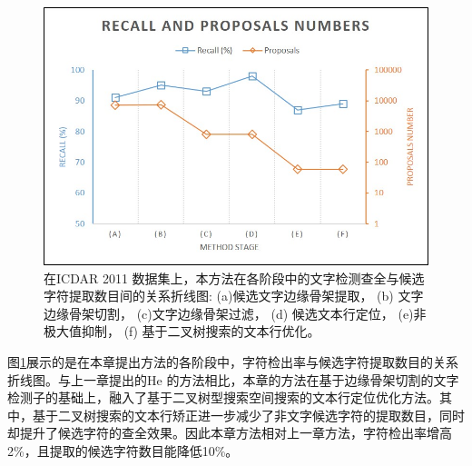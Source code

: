        \begin{figure}[!h]
        \centering
        \includegraphics[width=\textwidth]{./figures/c4_recall_proposals.jpg}
        \caption{在ICDAR 2011 数据集上，本方法在各阶段中的文字检测查全与候选字符提取数目间的关系折线图: (a)候选文字边缘骨架提取， (b) 文字边缘骨架切割， (c)文字边缘骨架过滤， (d) 候选文本行定位， (e)非极大值抑制， (f) 基于二叉树搜索的文本行优化。}
        \label{fig.c4_recall_proposals}
        \end{figure}

        图\ref{fig.c4_recall_proposals}展示的是在本章提出方法的各阶段中，字符检出率与候选字符提取数目的关系折线图。与上一章提出的He\cite{He2017scene} 的方法相比，本章的方法在基于边缘骨架切割的文字检测子的基础上，融入了基于二叉树型搜索空间搜索的文本行定位优化方法。其中，基于二叉树搜索的文本行矫正进一步减少了非文字候选字符的提取数目，同时却提升了候选字符的查全效果。因此本章方法相对上一章方法，字符检出率增高2\%，且提取的候选字符数目能降低10\%。

